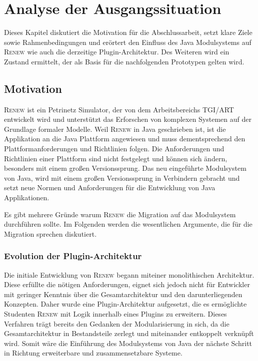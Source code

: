 \chapter{Analyse der Ausgangssituation} \label{cha:ausgangssituation}
	Dieses Kapitel diskutiert die Motivation für die Abschlussarbeit, setzt klare Ziele sowie Rahmenbedingungen und erörtert den Einfluss des Java Modulsystems auf \textsc{Renew} wie auch die derzeitige Plugin-Architektur. Des Weiteren wird ein Zustand ermittelt, der als Basis für die nachfolgenden Prototypen gelten wird.

\section{Motivation}\label{sec:motivation2}
	\textsc{Renew} ist ein Petrinetz Simulator, der von dem Arbeitsbereichs TGI/ART entwickelt wird und unterstützt das Erforschen von komplexen Systemen auf der Grundlage formaler Modelle.\newline
	Weil \textsc{Renew} in Java geschrieben ist, ist die Applikation an die Java Plattform angewiesen und muss dementsprechend den Plattformanforderungen und Richtlinien folgen. Die Anforderungen und Richtlinien einer Plattform sind nicht festgelegt und können sich ändern, besonders mit einem großen Versionssprung. Das neu eingeführte Modulsystem von Java, wird mit einem großen Versionssprung in Verbindern gebracht und setzt neue Normen und Anforderungen für die Entwicklung von Java Applikationen. \bigbreak
	
	Es gibt mehrere Gründe warum \textsc{Renew} die Migration auf das Modulsystem durchführen sollte. Im Folgenden werden die wesentlichen Argumente, die für die Migration sprechen diskutiert.  

	\subsection{Evolution der Plugin-Architektur} \label{sub:architektur}
		Die initiale Entwicklung von \textsc{Renew} begann miteiner monolithischen Architektur. Diese erfüllte die nötigen Anforderungen, eignet sich jedoch nicht für Entwickler mit geringer Kenntnis über die Gesamtarchitektur und den darunterliegenden Konzepten. Daher wurde eine Plugin-Architektur aufgesetzt, die es ermöglichte Studenten \textsc{Renew} mit Logik innerhalb eines Plugins zu erweitern. Dieses Verfahren trägt bereits den Gedanken der Modularisierung in sich, da die Gesamtarchitektur in Bestandsteile zerlegt und miteinander entkoppelt verknüpft wird. Somit wäre die Einführung des Modulsystems von Java der nächste Schritt in Richtung erweiterbare und zusammensetzbare Systeme.

